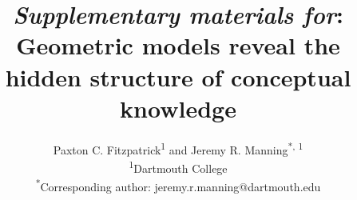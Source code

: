 \documentclass[10pt]{article}
\title{\textit{Supplementary materials for}: Geometric models reveal the hidden structure of conceptual knowledge}
\author{Paxton C. Fitzpatrick\textsuperscript{1} and Jeremy R.
Manning\textsuperscript{*, 1}\\\textsuperscript{1}Dartmouth
College\\\textsuperscript{*}Corresponding author:
jeremy.r.manning@dartmouth.edu}
\date{}
\newcommand{\demo}{1}
\begin{document}
\renewcommand{\figurename}{Supplementary Figure}

\setcounter{equation}{0}
\setcounter{figure}{0}
\setcounter{table}{0}
\setcounter{page}{1}
\setcounter{section}{0}
\makeatletter
\renewcommand{\theequation}{S\arabic{equation}}
\renewcommand{\thefigure}{S\arabic{figure}}
\renewcommand{\thetable}{S\arabic{table}}
\renewcommand{\bibnumfmt}[1]{[S#1]}
\renewcommand{\citenumfont}[1]{S#1}


\begin{titlepage}
\maketitle
\end{titlepage}

\begin{tiny}
\renewcommand*{\arraystretch}{1.4}
\begin{longtable}{r|p{0.375in}|p{1.275in}|p{0.75in}|p{0.75in}|p{0.75in}|p{0.75in}}


\end{longtable}
\end{tiny}
\end{document}

